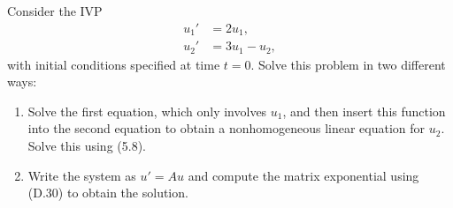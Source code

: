 

Consider the IVP
\begin{equation*}
\begin{split}
u_1' &= 2u_1,\\
u_2' &= 3u_1 - u_2,
\end{split}
\end{equation*}
with initial conditions specified at time $t=0$.  Solve this problem in two
different ways:

\begin{enumerate}
\item Solve the first equation, which only involves $u_1$, and then insert
this function into the second equation to obtain a nonhomogeneous linear
equation for $u_2$.  Solve this using (5.8).

\item Write the system as $u' = Au$ and compute the matrix exponential using
(D.30) to obtain the solution.
\end{enumerate}
